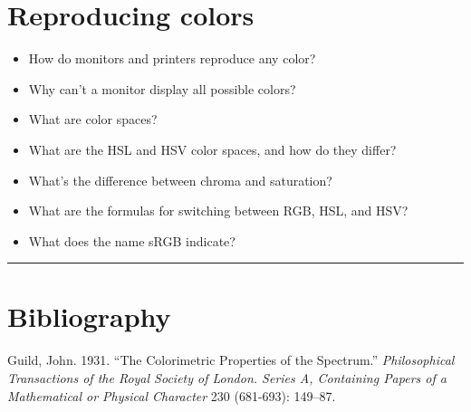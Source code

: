 \documentclass[
]{article}
\providecommand{\tightlist}{%
  \setlength{\itemsep}{0pt}\setlength{\parskip}{0pt}}
\newlength{\cslhangindent}
\newlength{\cslentryspacingunit} %
\newenvironment{CSLReferences}[2] %
 {%
  \setlength{\parindent}{0pt}
  \ifodd #1
  \let\oldpar\par
  \def\par{\hangindent=\cslhangindent\oldpar}
  \fi
  \setlength{\parskip}{\cslentryspacingunit}
 }%
 {}
\begin{document}
\hypertarget{reproducing-colors}{%
\section{Reproducing colors}\label{reproducing-colors}}

\begin{itemize}
\tightlist
\item
  How do monitors and printers reproduce any color?
\item
  Why can't a monitor display all possible colors?
\item
  What are color spaces?
\item
  What are the HSL and HSV color spaces, and how do they differ?
\item
  What's the difference between chroma and saturation?
\item
  What are the formulas for switching between RGB, HSL, and HSV?
\item
  What does the name sRGB indicate?
\end{itemize}

\begin{center}\rule{0.5\linewidth}{0.5pt}\end{center}

\hypertarget{bibliography}{%
\section*{Bibliography}\label{bibliography}}

\hypertarget{refs}{}
\begin{CSLReferences}{1}{0}
\leavevmode{}%
Guild, John. 1931. {``The Colorimetric Properties of the Spectrum.''}
\emph{Philosophical Transactions of the Royal Society of London. Series
A, Containing Papers of a Mathematical or Physical Character} 230
(681-693): 149--87.

\end{CSLReferences}
\end{document}
